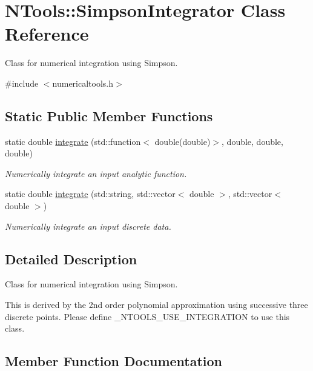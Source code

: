 \hypertarget{class_n_tools_1_1_simpson_integrator}{}\section{N\+Tools\+::Simpson\+Integrator Class Reference}
\label{class_n_tools_1_1_simpson_integrator}


Class for numerical integration using Simpson.  




{\ttfamily \#include $<$numericaltools.\+h$>$}

\subsection*{Static Public Member Functions}
\begin{DoxyCompactItemize}
\item 
static double \mbox{\hyperlink{class_n_tools_1_1_simpson_integrator_ab989aba56e07fc91b5a09c71489a1a6e}{integrate}} (std\+::function$<$ double(double)$>$, double, double, double)
\begin{DoxyCompactList}\small\item\em Numerically integrate an input analytic function. \end{DoxyCompactList}\item 
static double \mbox{\hyperlink{class_n_tools_1_1_simpson_integrator_af78fc1bfc5b95adeea5beed752f4a9c9}{integrate}} (std\+::string, std\+::vector$<$ double $>$, std\+::vector$<$ double $>$)
\begin{DoxyCompactList}\small\item\em Numerically integrate an input discrete data. \end{DoxyCompactList}\end{DoxyCompactItemize}


\subsection{Detailed Description}
Class for numerical integration using Simpson. 

This is derived by the 2nd order polynomial approximation using successive three discrete points. Please define \+\_\+\+N\+T\+O\+O\+L\+S\+\_\+\+U\+S\+E\+\_\+\+I\+N\+T\+E\+G\+R\+A\+T\+I\+ON to use this class. 

\subsection{Member Function Documentation}
\mbox{\label{class_n_tools_1_1_simpson_integrator_ab989aba56e07fc91b5a09c71489a1a6e}} 
